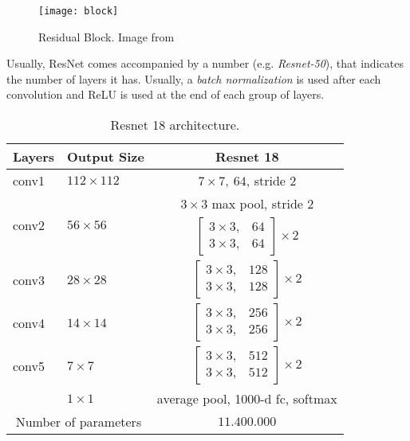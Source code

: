 \begin{figure}[H]
    \centering
    \texttt{[image: block]}
    \caption{Residual Block. Image from \cite{he2015deep} } \label{fig:resnet:block}
\end{figure}

Usually, ResNet comes accompanied by a number (e.g. \emph{Resnet-50}), that indicates the number of layers it has. Usually, a \emph{batch normalization} is used after each convolution and ReLU is used at the end of each group of layers.

\begin{table}[H]
    \centering
    \begin{tabular}{|l|l|c|}
    \hline
    Layers                      & Output Size                     & Resnet 18                                                                     \\ \hline
    conv1                    & $112\times112$                  & $7 \times 7, \ 64$, stride 2                                                  \\ \hline
    \multirow{2}{*}{conv2} & \multirow{2}{*}{$56 \times 56$} & $3 \times 3$ max pool, stride 2                                               \\ \cline{3-3} 
                                &                                 & $\begin{bmatrix}3 \times 3 , & 64 \\ 3 \times 3,& 64 \end{bmatrix} \times 2$  \\ \hline
    conv3                  & $28 \times 28$                  & $\begin{bmatrix} 3\times 3, & 128 \\ 3\times 3, & 128 \end{bmatrix} \times 2$ \\ \hline
    conv4                  & $14 \times 14$                  & $\begin{bmatrix} 3\times 3, & 256\\ 3\times 3, & 256\end{bmatrix} \times 2$   \\ \hline
    conv5                  & $7 \times 7$                    & $\begin{bmatrix} 3\times 3, & 512\\ 3\times 3, & 512\end{bmatrix} \times 2$   \\ \hline
                                & $1\times 1 $                    & average pool, 1000-d fc, softmax                                              \\ \hline
    \multicolumn{2}{|c|}{Number of parameters}              & $11.400.000$                    \\ \hline

    \end{tabular}
    \caption{Resnet 18 architecture.}
    \label{arch:resnet:18}
    \end{table}

